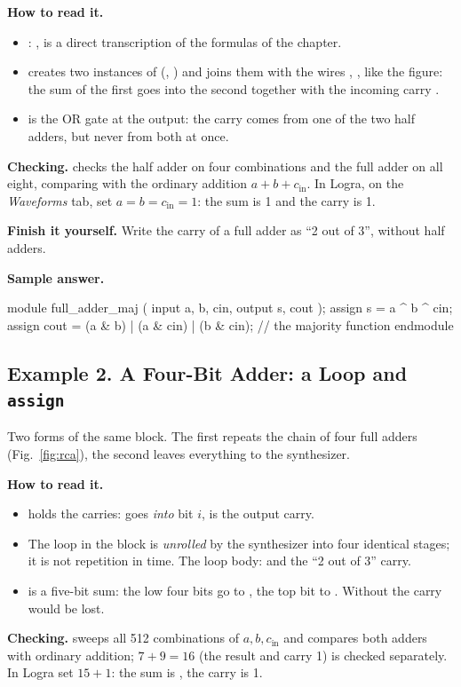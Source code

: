 \textbf{How to read it.}
\begin{itemize}
  \item {}: ,  is a direct transcription of the formulas of the chapter.
  \item {} creates two instances of  (, ) and joins them with the wires , ,  like the figure: the sum of the first goes into the second together with the incoming carry .
  \item {} is the OR gate at the output: the carry comes from one of the two half adders, but never from both at once.
\end{itemize}
\textbf{Checking.}  checks the half adder on four
combinations and the full adder on all eight, comparing  with the
ordinary addition $a+b+c_\text{in}$. In Logra, on the \emph{Waveforms} tab, set
$a=b=c_\text{in}=1$: the sum is 1 and the carry is 1.

\textbf{Finish it yourself.} Write the carry of a full adder as ``2 out of 3'',
without half adders.

\textbf{Sample answer.}
\begin{vcode}
module full_adder_maj (
    input  a, b, cin,
    output s, cout
);
    assign s    = a ^ b ^ cin;
    assign cout = (a & b) | (a & cin) | (b & cin);   // the majority function
endmodule
\end{vcode}

\subsection{Example 2. A Four-Bit Adder: a Loop and \texttt{assign}}

Two forms of the same block. The first repeats the chain of four full adders
(Fig.~\ref{fig:rca}), the second leaves everything to the synthesizer.


\textbf{How to read it.}
\begin{itemize}
  \item {} holds the carries:  goes \emph{into} bit $i$,  is the output carry.
  \item The  loop in the  block is \emph{unrolled} by the synthesizer into four identical stages; it is not repetition in time. The loop body:  and the ``2 out of 3'' carry.
  \item {} is a five-bit sum: the low four bits go to , the top bit to . Without  the carry would be lost.
\end{itemize}
\textbf{Checking.}  sweeps all 512 combinations of
$a,b,c_\text{in}$ and compares both adders with ordinary addition; $7+9=16$
(the result  and carry 1) is checked separately. In Logra set
$15+1$: the sum is , the carry is 1.

